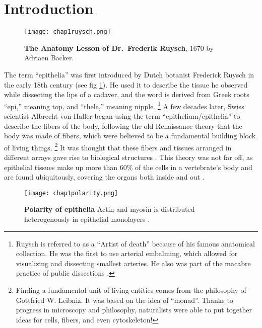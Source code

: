 

\hypertarget{introduction}{%
	\section{Introduction}\label{introduction}}

\begin{figure}[h!]
	\centering
	\texttt{[image: chap1ruysch.png]}
	\caption{\label{fig_1_1} \textbf{The Anatomy Lesson of Dr.~Frederik Ruysch}, 1670 by
		Adriaen Backer. \cite{ruyshc}}
\end{figure}

The term ``epithelia'' was first introduced by Dutch botanist Frederick Ruysch in the early 18th century (see fig \ref{fig_1_1}). He used it to describe the tissue he observed while dissecting the lips of a cadaver, and the word is derived from Greek roots ``epi,'' meaning top, and ``thele,'' meaning nipple.
\footnote{Ruysch is referred to as a ``Artist of death'' because of his famous anatomical collection. He was the first to use arterial embalming, which allowed for visualizing and dissecting smallest
	arteries. He also was part of the macabre practice of public dissections \cite{halley2019}.}
A few decades later, Swiss scientist Albrecht von Haller began using the term ``epithelium/epithelia'' to describe the fibers of the body, following the old Renaissance theory that the body was made of fibers, which were believed to be a fundamental building block of living things.
\footnote{Finding a fundamental unit of living entities comes from the philosophy of Gottfried W. Leibniz. It was based on the idea of ``monad''. Thanks to progress in microscopy and philosophy, naturalists were able to put together ideas for cells, fibers, and even cytoskeleton!\cite{zampieri2014}}
It was thought that these fibers and tissues arranged in different arrays gave rise to biological structures \cite{maccord2012, zampieri2014}. This theory was not far off, as epithelial tissues make up more than 60\% of the cells in a vertebrate's body and are found ubiquitously, covering the organs both inside and out \cite{alberts2015}.

\begin{wrapfigure}{r}{5cm}
	\caption{\textbf{Polarity of epithelia} Actin and myosin is distributed heterogenously in epithelial monolayers \cite{chen2018}.}\label{fig_1_2}
	\centering
	\texttt{[image: chap1polarity.png]}
\end{wrapfigure}

